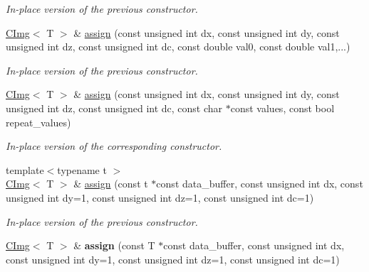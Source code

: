 \begin{DoxyCompactItemize}
\begin{DoxyCompactList}\small\item\em In-\/place version of the previous constructor. \item\end{DoxyCompactList}\item 
\hypertarget{structcimg__library_1_1CImg_ac4107d5e6f9ef02b3428a9427e21d8f7}{
\hyperlink{structcimg__library_1_1CImg}{CImg}$<$ T $>$ \& \hyperlink{structcimg__library_1_1CImg_ac4107d5e6f9ef02b3428a9427e21d8f7}{assign} (const unsigned int dx, const unsigned int dy, const unsigned int dz, const unsigned int dc, const double val0, const double val1,...)}
\label{structcimg__library_1_1CImg_ac4107d5e6f9ef02b3428a9427e21d8f7}

\begin{DoxyCompactList}\small\item\em In-\/place version of the previous constructor. \item\end{DoxyCompactList}\item 
\hypertarget{structcimg__library_1_1CImg_ab9f915c3722909290c0f813395bf56db}{
\hyperlink{structcimg__library_1_1CImg}{CImg}$<$ T $>$ \& \hyperlink{structcimg__library_1_1CImg_ab9f915c3722909290c0f813395bf56db}{assign} (const unsigned int dx, const unsigned int dy, const unsigned int dz, const unsigned int dc, const char $\ast$const values, const bool repeat\_\-values)}
\label{structcimg__library_1_1CImg_ab9f915c3722909290c0f813395bf56db}

\begin{DoxyCompactList}\small\item\em In-\/place version of the corresponding constructor. \item\end{DoxyCompactList}\item 
\hypertarget{structcimg__library_1_1CImg_a0e3ab6553d00b4a7f1ea06d31576d27e}{
{\footnotesize template$<$typename t $>$ }\\\hyperlink{structcimg__library_1_1CImg}{CImg}$<$ T $>$ \& \hyperlink{structcimg__library_1_1CImg_a0e3ab6553d00b4a7f1ea06d31576d27e}{assign} (const t $\ast$const data\_\-buffer, const unsigned int dx, const unsigned int dy=1, const unsigned int dz=1, const unsigned int dc=1)}
\label{structcimg__library_1_1CImg_a0e3ab6553d00b4a7f1ea06d31576d27e}

\begin{DoxyCompactList}\small\item\em In-\/place version of the previous constructor. \item\end{DoxyCompactList}\item 
\hypertarget{structcimg__library_1_1CImg_a6de9f535c636ec6e21df7ac991f1f316}{
\hyperlink{structcimg__library_1_1CImg}{CImg}$<$ T $>$ \& {\bfseries assign} (const T $\ast$const data\_\-buffer, const unsigned int dx, const unsigned int dy=1, const unsigned int dz=1, const unsigned int dc=1)}
\label{structcimg__library_1_1CImg_a6de9f535c636ec6e21df7ac991f1f316}


\end{DoxyCompactItemize}
